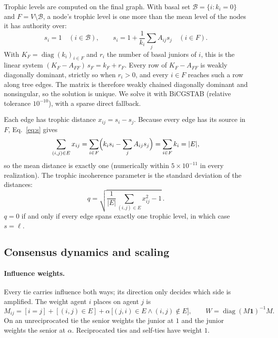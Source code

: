Trophic levels are computed on the final graph. With basal set
$\mathcal B=\{i:k_i=0\}$ and $F=V\setminus\mathcal B$, a node's trophic level
is one more than the mean level of the nodes it has authority over:
\begin{equation}
  s_i=1\quad(i\in\mathcal B),\qquad
  s_i=1+\frac{1}{k_i}\sum_jA_{ij}s_j\quad(i\in F).
  \label{eq:s}
\end{equation}
With $K_F=\operatorname{diag}(k_i)_{i\in F}$ and $r_i$ the number of basal
juniors of $i$, this is the linear system
$(K_F-A_{FF})\,s_F=k_F+r_F$. Every row of $K_F-A_{FF}$ is weakly diagonally
dominant, strictly so when $r_i>0$, and every $i\in F$ reaches such a row along
tree edges. The matrix is therefore weakly chained diagonally dominant and
nonsingular, so the solution is unique. We solve it with BiCGSTAB (relative
tolerance $10^{-10}$), with a sparse direct fallback.

Each edge has trophic distance $x_{ij}=s_i-s_j$. Because every edge has its
source in $F$, Eq.~\eqref{eq:s} gives
\begin{equation}
  \sum_{(i,j)\in E}x_{ij}=\sum_{i\in F}\Bigl(k_is_i-\sum_jA_{ij}s_j\Bigr)=\sum_{i\in F}k_i=|E|,
  \label{eq:x}
\end{equation}
so the mean distance is exactly one (numerically within $5\times10^{-11}$ in
every realization). The trophic incoherence parameter is the standard
deviation of the distances:
\begin{equation}
  q=\sqrt{\frac{1}{|E|}\sum_{(i,j)\in E}x_{ij}^2-1}\, .
  \label{eq:q}
\end{equation}
$q=0$ if and only if every edge spans exactly one trophic level, in which case
$s=\ell$.

\subsection{Consensus dynamics and scaling}
\label{sec:dynamics}

\paragraph{Influence weights.}
Every tie carries influence both ways; its direction only decides which side
is amplified. The weight agent $i$ places on agent $j$ is
\begin{equation}
  M_{ij}=[i=j]+[(i,j)\in E]+\alpha\,\bigl[(j,i)\in E\wedge(i,j)\notin E\bigr],
  \qquad W=\operatorname{diag}(M\mathbf1)^{-1}M .
  \label{eq:W}
\end{equation}
On an unreciprocated tie the senior weights the junior at $1$ and the junior
weights the senior at $\alpha$. Reciprocated ties and self-ties have weight
$1$.

